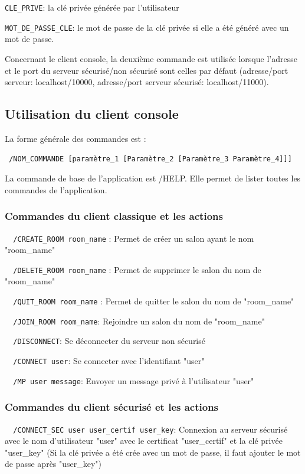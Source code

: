 \documentclass[a4paper,11pt,french]{book}
\begin{document}
\verb+CLE_PRIVE+: la clé privée générée par l'utilisateur

\verb+MOT_DE_PASSE_CLE+: le mot de passe de la clé privée si elle a été généré avec un mot de passe.

	Concernant le client console, la deuxième commande est utilisée lorsque l'adresse et le port du serveur sécurisé/non sécurisé sont celles par défaut (adresse/port serveur: localhost/10000, adresse/port serveur sécurisé: localhost/11000).
	
\subsection{Utilisation du client console}
	
	La forme générale des commandes est : 
	
\verb+ /NOM_COMMANDE [paramètre_1 [Paramètre_2 [Paramètre_3 Paramètre_4]]]+

La commande de base de l'application est /HELP. Elle permet de lister toutes les commandes de l'application.
\subsubsection{Commandes du client classique et les actions}

\verb+	/CREATE_ROOM room_name+  : Permet de créer un salon ayant le nom "room\_name"

\verb+	/DELETE_ROOM room_name+ :  Permet de supprimer le salon du nom de "room\_name"

\verb+	/QUIT_ROOM room_name+ :  Permet de quitter le salon du nom de "room\_name"

\verb+	/JOIN_ROOM room_name+:  Rejoindre un salon du nom de "room\_name"

\verb+	/DISCONNECT+: Se déconnecter du serveur non sécurisé

\verb+	/CONNECT user+:  Se connecter avec l'identifiant "user"

\verb+	/MP user message+: Envoyer un message privé à l'utilisateur "user"
			
\subsubsection{Commandes du client sécurisé et les actions}

\verb+	/CONNECT_SEC user user_certif user_key+: Connexion au serveur sécurisé avec le nom d'utilisateur "user" avec le certificat "user\_certif" et la clé privée "user\_key" (Si la clé privée a été crée avec un mot de passe, il faut ajouter le mot de passe après "user\_key")
\end{document}
